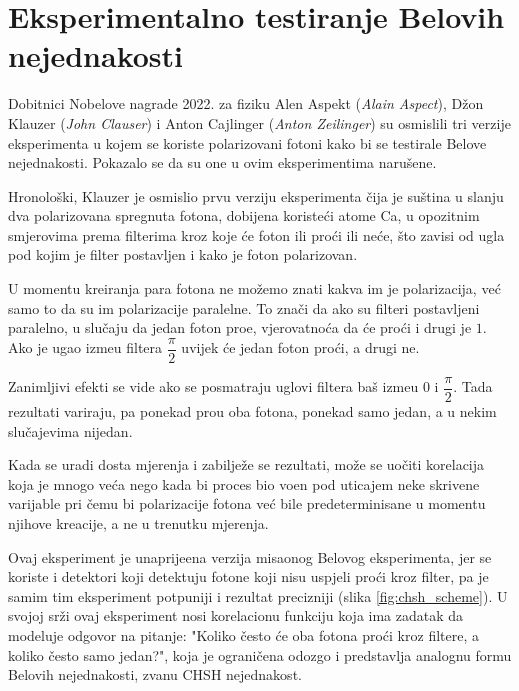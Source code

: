 \chapter{Eksperimentalno testiranje Belovih nejednakosti}

Dobitnici Nobelove nagrade 2022. za fiziku Alen Aspekt (\textit{Alain Aspect}), D\v zon Klauzer (\textit{John Clauser}) i Anton Cajlinger (\textit{Anton Zeilinger})
su osmislili tri verzije eksperimenta u kojem se koriste polarizovani fotoni kako bi se
testirale Belove nejednakosti. Pokazalo se da su one u ovim eksperimentima naru\v sene.

Hronolo\v ski, Klauzer je osmislio prvu verziju eksperimenta \v cija je 
su\v stina u slanju dva polarizovana spregnuta fotona, dobijena koriste\' ci atome Ca, u opozitnim smjerovima prema filterima kroz koje
\' ce foton ili pro\' ci ili ne\' ce, \v sto zavisi od ugla pod kojim je filter postavljen
i kako je foton polarizovan.

U momentu kreiranja para fotona ne mo\v zemo znati kakva im je polarizacija, ve\' c samo to da su im
polarizacije paralelne. To zna\v ci da ako su filteri postavljeni paralelno, u slu\v caju da jedan foton pro\dj e, vjerovatno\' ca da \' ce pro\' ci i drugi je $1$.
Ako je ugao izme\dj u filtera $\dfrac{\pi}{2}$ uvijek \' ce jedan foton pro\' ci, a drugi ne.

Zanimljivi efekti se vide ako se posmatraju uglovi filtera ba\v s izme\dj u $0$ i $\dfrac{\pi}{2}$. Tada rezultati variraju,
pa ponekad pro\dj u oba fotona, ponekad samo jedan, a u nekim slu\v cajevima nijedan.

Kada se uradi dosta mjerenja i zabilje\v ze se rezultati, mo\v ze se uo\v citi korelacija koja je mnogo ve\'ca nego kada bi
proces bio vo\dj en pod uticajem neke skrivene varijable pri \v cemu bi polarizacije fotona ve\'c bile predeterminisane u momentu njihove kreacije, a ne u trenutku mjerenja.

Ovaj eksperiment je unaprije\dj ena verzija misaonog Belovog eksperimenta, jer se koriste i detektori koji
detektuju fotone koji nisu uspjeli pro\'ci kroz filter, pa je samim tim eksperiment potpuniji i rezultat precizniji (slika \ref{fig:chsh_scheme}).
U svojoj sr\v zi ovaj eksperiment nosi korelacionu funkciju koja ima zadatak da modeluje odgovor na pitanje: "Koliko
\v cesto \'ce oba fotona pro\' ci kroz filtere, a koliko \v cesto samo jedan?", koja je ograni\v cena odozgo i predstavlja analognu formu
Belovih nejednakosti, zvanu CHSH nejednakost.

